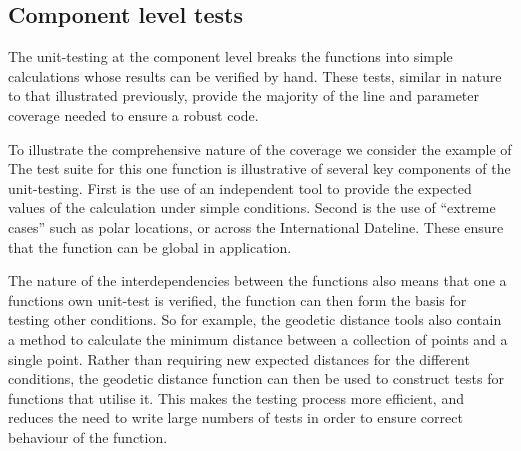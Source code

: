 \subsection{Component level tests}
The unit-testing at the component level breaks the functions into simple
calculations whose results can be verified by hand. These tests, similar in nature to that illustrated previously, provide the majority of the line and parameter coverage needed to ensure a robust code.

To illustrate the comprehensive nature of the coverage we consider the example of 
%
The test suite for this one function is illustrative of several key components of the unit-testing. First is the use of an independent tool to provide the expected values of the calculation under simple conditions. Second is the use of ``extreme cases'' such as polar locations, or across the International Dateline. These ensure that the function can be global in application.

The nature of the interdependencies between the functions also means that one a functions own unit-test is verified, the function can then form the basis for testing other conditions. So for example, the geodetic distance tools also contain a method to calculate the minimum distance between a collection of points and a single point. Rather than requiring new expected distances for the different conditions, the geodetic distance function can then be used to construct tests for functions that utilise it. This makes the testing process more efficient, and reduces the need to write large numbers of tests in order to ensure correct behaviour of the function.